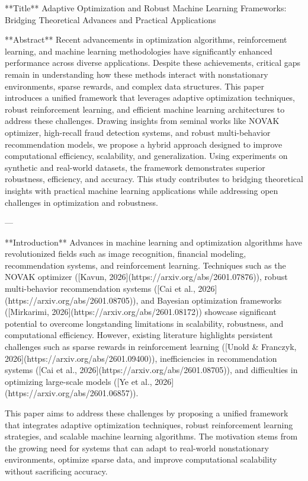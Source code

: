**Title**  
Adaptive Optimization and Robust Machine Learning Frameworks: Bridging Theoretical Advances and Practical Applications  

**Abstract**  
Recent advancements in optimization algorithms, reinforcement learning, and machine learning methodologies have significantly enhanced performance across diverse applications. Despite these achievements, critical gaps remain in understanding how these methods interact with nonstationary environments, sparse rewards, and complex data structures. This paper introduces a unified framework that leverages adaptive optimization techniques, robust reinforcement learning, and efficient machine learning architectures to address these challenges. Drawing insights from seminal works like NOVAK optimizer, high-recall fraud detection systems, and robust multi-behavior recommendation models, we propose a hybrid approach designed to improve computational efficiency, scalability, and generalization. Using experiments on synthetic and real-world datasets, the framework demonstrates superior robustness, efficiency, and accuracy. This study contributes to bridging theoretical insights with practical machine learning applications while addressing open challenges in optimization and robustness.

---

**Introduction**  
Advances in machine learning and optimization algorithms have revolutionized fields such as image recognition, financial modeling, recommendation systems, and reinforcement learning. Techniques such as the NOVAK optimizer ([Kavun, 2026](https://arxiv.org/abs/2601.07876)), robust multi-behavior recommendation systems ([Cai et al., 2026](https://arxiv.org/abs/2601.08705)), and Bayesian optimization frameworks ([Mirkarimi, 2026](https://arxiv.org/abs/2601.08172)) showcase significant potential to overcome longstanding limitations in scalability, robustness, and computational efficiency. However, existing literature highlights persistent challenges such as sparse rewards in reinforcement learning ([Unold & Franczyk, 2026](https://arxiv.org/abs/2601.09400)), inefficiencies in recommendation systems ([Cai et al., 2026](https://arxiv.org/abs/2601.08705)), and difficulties in optimizing large-scale models ([Ye et al., 2026](https://arxiv.org/abs/2601.06857)).

This paper aims to address these challenges by proposing a unified framework that integrates adaptive optimization techniques, robust reinforcement learning strategies, and scalable machine learning algorithms. The motivation stems from the growing need for systems that can adapt to real-world nonstationary environments, optimize sparse data, and improve computational scalability without sacrificing accuracy.


